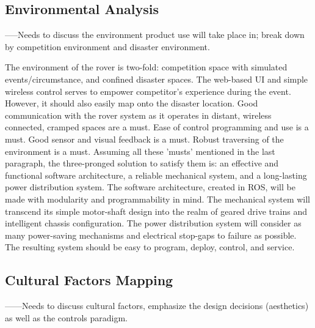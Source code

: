 \documentclass[a4paper, 10pt]{article}
\begin{document}
	\subsection{Environmental Analysis}
	-----Needs to discuss the environment product use will take place in; break down by competition environment and disaster environment.
	
	The environment of the rover is two-fold: competition space with simulated events/circumstance, and confined disaster spaces. The web-based UI and simple wireless control serves to empower competitor's experience during the event. However, it should also easily map onto the disaster location. Good communication with the rover system as it operates in distant, wireless connected, cramped spaces are a must. Ease of control programming and use is a must. Good sensor and visual feedback is a must. Robust traversing of the environment is a must. 
Assuming all these 'musts' mentioned in the last paragraph, the three-pronged solution to satisfy them is: an effective and functional software architecture, a reliable mechanical system, and a long-lasting power distribution system. The software architecture, created in ROS, will be made with modularity and programmability in mind. The mechanical system will transcend its simple motor-shaft design into the realm of geared drive trains and intelligent chassis configuration. The power distribution system will consider as many power-saving mechanisms and electrical stop-gaps to failure as possible. The resulting system should be easy to program, deploy, control, and service.

	\subsection{Cultural Factors Mapping}
	------Needs to discuss cultural factors, emphasize the design decisions (aesthetics) as well as the controls paradigm. 	
	
\end{document}
